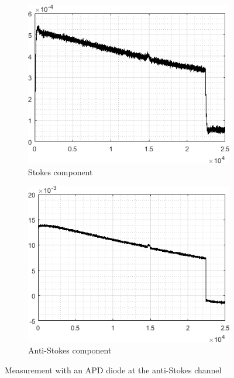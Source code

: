 \documentclass{standalone}
\begin{document}
\begin{figure}[h]
	\centering
	\begin{subfigure}[b]{0.49\textwidth}
		\includegraphics[width=\textwidth]{apd_scattering_stokes}
		\caption{Stokes component}
	\end{subfigure}
	\begin{subfigure}[b]{0.49\textwidth}
		\includegraphics[width=\textwidth]{apd_scattering_antistokes.png}
		\caption{Anti-Stokes component}
	\end{subfigure}
	\caption{Measurement with an APD diode at the anti-Stokes channel}
	\label{fig:apd_scattering}
\end{figure}
\end{document}
